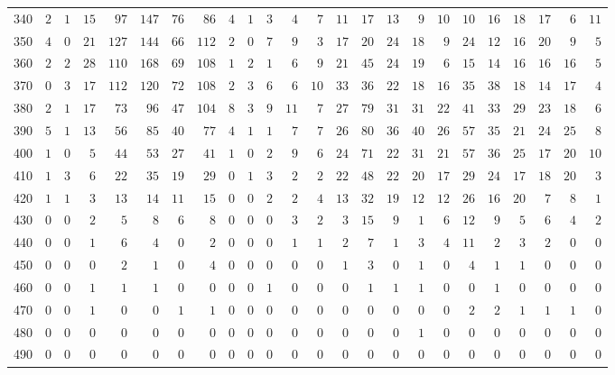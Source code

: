 \begin{sidewaystable}[!tbp]
\begin{center}
\begin{tabular}{lrrrrrrrrrrrrrrrrrrrrrrr}
340&$ 2$&$1$&$ 15$&$ 97$&$147$&$ 76$&$ 86$&$4$&$1$&$ 3$&$ 4$&$ 7$&$ 11$&$ 17$&$ 13$&$ 9$&$10$&$ 10$&$ 16$&$ 18$&$ 17$&$  6$&$ 11$\tabularnewline
350&$ 4$&$0$&$ 21$&$127$&$144$&$ 66$&$112$&$2$&$0$&$ 7$&$ 9$&$ 3$&$ 17$&$ 20$&$ 24$&$18$&$ 9$&$ 24$&$ 12$&$ 16$&$ 20$&$  9$&$  5$\tabularnewline
360&$ 2$&$2$&$ 28$&$110$&$168$&$ 69$&$108$&$1$&$2$&$ 1$&$ 6$&$ 9$&$ 21$&$ 45$&$ 24$&$19$&$ 6$&$ 15$&$ 14$&$ 16$&$ 16$&$ 16$&$  5$\tabularnewline
370&$ 0$&$3$&$ 17$&$112$&$120$&$ 72$&$108$&$2$&$3$&$ 6$&$ 6$&$10$&$ 33$&$ 36$&$ 22$&$18$&$16$&$ 35$&$ 38$&$ 18$&$ 14$&$ 17$&$  4$\tabularnewline
380&$ 2$&$1$&$ 17$&$ 73$&$ 96$&$ 47$&$104$&$8$&$3$&$ 9$&$11$&$ 7$&$ 27$&$ 79$&$ 31$&$31$&$22$&$ 41$&$ 33$&$ 29$&$ 23$&$ 18$&$  6$\tabularnewline
390&$ 5$&$1$&$ 13$&$ 56$&$ 85$&$ 40$&$ 77$&$4$&$1$&$ 1$&$ 7$&$ 7$&$ 26$&$ 80$&$ 36$&$40$&$26$&$ 57$&$ 35$&$ 21$&$ 24$&$ 25$&$  8$\tabularnewline
400&$ 1$&$0$&$  5$&$ 44$&$ 53$&$ 27$&$ 41$&$1$&$0$&$ 2$&$ 9$&$ 6$&$ 24$&$ 71$&$ 22$&$31$&$21$&$ 57$&$ 36$&$ 25$&$ 17$&$ 20$&$ 10$\tabularnewline
410&$ 1$&$3$&$  6$&$ 22$&$ 35$&$ 19$&$ 29$&$0$&$1$&$ 3$&$ 2$&$ 2$&$ 22$&$ 48$&$ 22$&$20$&$17$&$ 29$&$ 24$&$ 17$&$ 18$&$ 20$&$  3$\tabularnewline
420&$ 1$&$1$&$  3$&$ 13$&$ 14$&$ 11$&$ 15$&$0$&$0$&$ 2$&$ 2$&$ 4$&$ 13$&$ 32$&$ 19$&$12$&$12$&$ 26$&$ 16$&$ 20$&$  7$&$  8$&$  1$\tabularnewline
430&$ 0$&$0$&$  2$&$  5$&$  8$&$  6$&$  8$&$0$&$0$&$ 0$&$ 3$&$ 2$&$  3$&$ 15$&$  9$&$ 1$&$ 6$&$ 12$&$  9$&$  5$&$  6$&$  4$&$  2$\tabularnewline
440&$ 0$&$0$&$  1$&$  6$&$  4$&$  0$&$  2$&$0$&$0$&$ 0$&$ 1$&$ 1$&$  2$&$  7$&$  1$&$ 3$&$ 4$&$ 11$&$  2$&$  3$&$  2$&$  0$&$  0$\tabularnewline
450&$ 0$&$0$&$  0$&$  2$&$  1$&$  0$&$  4$&$0$&$0$&$ 0$&$ 0$&$ 0$&$  1$&$  3$&$  0$&$ 1$&$ 0$&$  4$&$  1$&$  1$&$  0$&$  0$&$  0$\tabularnewline
460&$ 0$&$0$&$  1$&$  1$&$  1$&$  0$&$  0$&$0$&$0$&$ 1$&$ 0$&$ 0$&$  0$&$  1$&$  1$&$ 1$&$ 0$&$  0$&$  1$&$  0$&$  0$&$  0$&$  0$\tabularnewline
470&$ 0$&$0$&$  1$&$  0$&$  0$&$  1$&$  1$&$0$&$0$&$ 0$&$ 0$&$ 0$&$  0$&$  0$&$  0$&$ 0$&$ 0$&$  2$&$  2$&$  1$&$  1$&$  1$&$  0$\tabularnewline
480&$ 0$&$0$&$  0$&$  0$&$  0$&$  0$&$  0$&$0$&$0$&$ 0$&$ 0$&$ 0$&$  0$&$  0$&$  0$&$ 1$&$ 0$&$  0$&$  0$&$  0$&$  0$&$  0$&$  0$\tabularnewline
490&$ 0$&$0$&$  0$&$  0$&$  0$&$  0$&$  0$&$0$&$0$&$ 0$&$ 0$&$ 0$&$  0$&$  0$&$  0$&$ 0$&$ 0$&$  0$&$  0$&$  0$&$  0$&$  0$&$  0$\tabularnewline
\hline
\end{tabular}
\end{center}
\end{sidewaystable}

